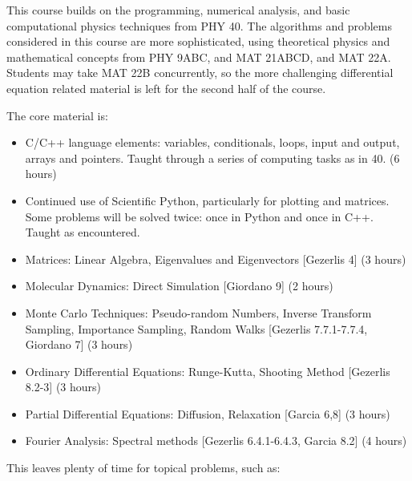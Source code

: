 \documentclass[12pt]{article}
\begin{document}
This course builds on the programming, numerical analysis, and basic
computational physics techniques from PHY 40.  The algorithms and
problems considered in this course are more sophisticated, using
theoretical physics and mathematical concepts from PHY 9ABC, and MAT
21ABCD, and MAT 22A.  Students may take MAT 22B concurrently, so the
more challenging differential equation related material is left for
the second half of the course.

The core material is:
\begin{itemize}
\item C/C++ language elements: variables, conditionals, loops, input
  and output, arrays and pointers.  Taught through a series of
  computing tasks as in 40. (6 hours)
\item Continued use of Scientific Python, particularly for plotting
  and matrices.  Some problems will be solved twice: once in Python
  and once in C++.  Taught as encountered.
\item Matrices: Linear Algebra, Eigenvalues and Eigenvectors [Gezerlis 4] (3 hours)
\item Molecular Dynamics:  Direct Simulation [Giordano 9] (2 hours)
\item Monte Carlo Techniques: Pseudo-random Numbers, Inverse Transform Sampling, Importance Sampling, Random Walks [Gezerlis 7.7.1-7.7.4, Giordano 7] (3 hours)
\item Ordinary Differential Equations:  Runge-Kutta, Shooting Method [Gezerlis 8.2-3] (3 hours)
\item Partial  Differential Equations:  Diffusion, Relaxation  [Garcia 6,8] (3 hours)
\item Fourier Analysis:  Spectral methods [Gezerlis 6.4.1-6.4.3, Garcia 8.2] (4 hours)
\end{itemize}
This leaves plenty of time for topical problems, such as:
\end{document}
